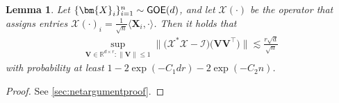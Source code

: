 \documentclass[10pt]{article}
\newcommand{\s}{^*}
\renewcommand{\t}{^{\top}}
\newtheorem{lemma}{Lemma}
\theoremstyle{definition}
\begin{document}
\begin{lemma} \label{lem:netargument}
Let $\{\bm{X}_i\}_{i=1}^{n} \sim {\sf GOE}(d)$, and let $\mathcal{X}(\cdot)$ be the operator that assigns entries $\mathcal{X}(\cdot)_i = \frac{1}{\sqrt{n}} \langle \bm{X}_i, \cdot\rangle $.  Then it holds that 
\begin{align}
  \sup_{\bm{V}  \in \mathbb{R}^{d \times r}:  \|\bm{V} \| \leq 1 }  \bigg\| \big( \mathcal{X}\s \mathcal{X} - \mathcal{I} \big) \big( \bm{VV}\t \big) \bigg\| \lesssim \frac{ r\sqrt{d}}{\sqrt{n}} 
\end{align}
with probability at least $1 - 2 \exp ( - C_1 dr) - 2 \exp( - C_2 n )$.    
\end{lemma}
\begin{proof}
    See \cref{sec:netargumentproof}.
\end{proof}
\end{document}
